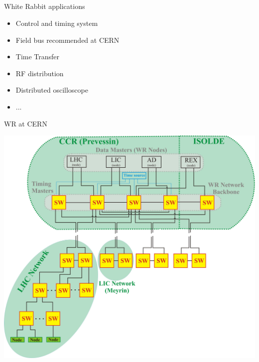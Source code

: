 \documentclass[compress,red]{beamer}
\begin{document}
\subsection{}
\begin{frame}{White Rabbit applications}

  \begin{itemize}
    \item Control and timing system
    \item Field bus recommended at CERN
    \item Time Transfer
    \item RF distribution
    \item Distributed oscilloscope
    \item ...
  \end{itemize}

\end{frame}
\begin{frame}{WR at CERN}

    \begin{center}
      \includegraphics[width=.7\textwidth]{applications/CERN/NT-overview.pdf}
    \end{center}

\end{frame}
\end{document}
